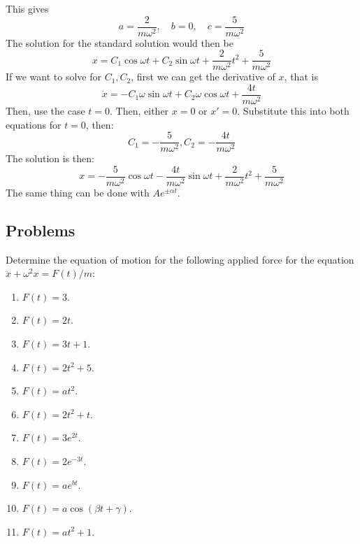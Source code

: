 This gives
\begin{equation}
    a = \frac{2}{m\omega^{2}}, \quad b = 0 , \quad c= \frac{5}{m\omega^{2}}
\end{equation}
The solution for the standard solution would then be 
\begin{equation}
    x = C_{1}\cos{\omega t} + C_{2}\sin{\omega t} + \frac{2}{m\omega^{2}} t^{2} + \frac{5}{m\omega^{2}}
\end{equation}
If we want to solve for $C_{1},C_{2}$, first we can get the derivative of $x$, that is
\begin{equation}
    \dot{x} = -C_{1}\omega\sin{\omega t} + C_{2}\omega\cos{\omega t} + \frac{4t}{m\omega^{2}}
\end{equation}
Then, use the case $t=0$. Then, either $x=0$ or $x'=0$. Substitute this into both equations for $t=0$, then: 
\begin{equation}
    C_{1} = -\frac{5}{m\omega^{2}}, C_{2} = -\frac{4t}{m\omega^{2}}
\end{equation}
The solution is then: 
\begin{equation}
    x = -\frac{5}{m\omega^{2}}\cos{\omega t} -\frac{4t}{m\omega^{2}}\sin{\omega t}+ \frac{2}{m\omega^{2}} t^{2} + \frac{5}{m\omega^{2}}
\end{equation}
The same thing can be done with $Ae^{\pm\alpha t}$. 
\subsection{Problems}
\begin{setting}
    Determine the equation of motion for the following applied force for the equation $\ddot{x}+\omega^{2}x = F(t)/m$: 
    \begin{enumerate}[noitemsep, topsep=1pt]
        \item $F(t)=3$. 
        \item $F(t)=2t$. 
        \item $F(t)=3t+1$.
        \item $F(t)=2t^{2}+5$.
        \item $F(t)=at^{2}$. 
        \item $F(t)=2t^{2}+t$.
        \item $F(t)=3e^{2t}$. 
        \item $F(t)=2e^{-3t}$. 
        \item $F(t)=ae^{bt}$.
        \item $F(t)=a\cos{(\beta t+ \gamma)}$. 
        \item $F(t)=at^{2}+1$. 
    \end{enumerate}
\end{setting}
